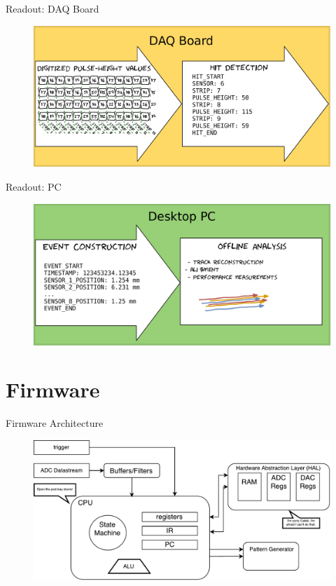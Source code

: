\documentclass{beamer}
\begin{document}
\begin{frame}{Readout: DAQ Board}
\begin{figure}
\centering
\includegraphics[width=\textwidth]{figures/B2}
\end{figure}
\end{frame}

\begin{frame}{Readout: PC}
\begin{figure}
\centering
\includegraphics[width=\textwidth]{figures/B3}
\end{figure}
\end{frame}

\section{Firmware}
\begin{frame}{Firmware Architecture}
\begin{figure}
\centering
\includegraphics[width=\textwidth]{figures/Firmware_Architecture}
\end{figure}
\end{frame}
\end{document}
